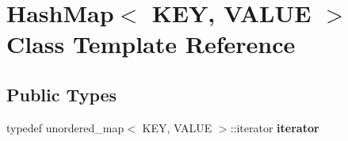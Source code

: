 \hypertarget{class_hash_map}{}\section{Hash\+Map$<$ K\+E\+Y, V\+A\+L\+U\+E $>$ Class Template Reference}
\label{class_hash_map}
\subsection*{Public Types}
\begin{DoxyCompactItemize}
\item 
\hypertarget{class_hash_map_a0253297a2d2712a409956b0cfd3ac717}{}typedef unordered\+\_\+map$<$ K\+E\+Y, V\+A\+L\+U\+E $>$\+::iterator {\bfseries iterator}\label{class_hash_map_a0253297a2d2712a409956b0cfd3ac717}

\end{DoxyCompactItemize}
